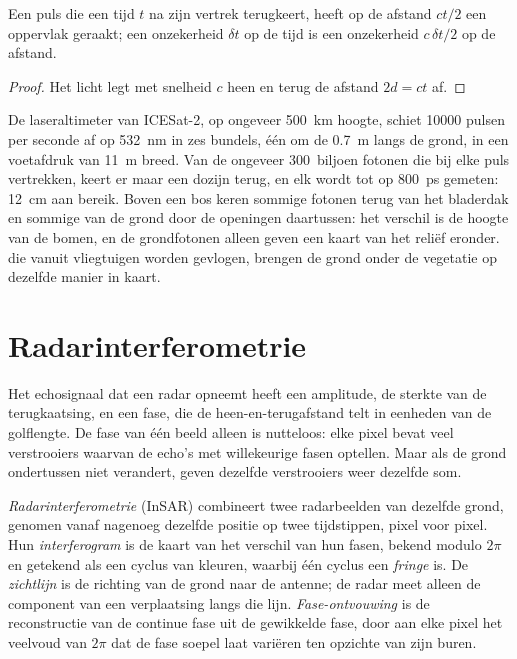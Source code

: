 \begin{proposition}[Vluchttijd]\label{prop:b3:remote-sensing-gis:tof}
Een puls die een tijd $t$ na zijn vertrek terugkeert, heeft
op de afstand $ct/2$ een oppervlak geraakt; een onzekerheid $\delta t$ op de tijd is een onzekerheid
$c\,\delta t/2$ op de afstand.
\end{proposition}

\begin{proof}
Het licht legt met snelheid $c$ heen en terug de afstand $2d = ct$ af.
\end{proof}

De laseraltimeter van ICESat-2, op ongeveer \qty{500}{km} hoogte, schiet
\num{10000} pulsen per seconde af op \qty{532}{nm} in zes bundels, één om de
\qty{0.7}{m} langs de grond, in een voetafdruk van \qty{11}{m} breed. Van de
ongeveer 300~biljoen fotonen die bij elke puls vertrekken, keert er maar een dozijn
terug, en elk wordt tot op \qty{800}{ps} gemeten: \qty{12}{cm} aan bereik. Boven een
bos keren sommige fotonen terug van het bladerdak en sommige van de grond
door de openingen daartussen: het verschil is de hoogte van de bomen, en de
grondfotonen alleen geven een kaart van het reliëf eronder.  die vanuit
vliegtuigen worden gevlogen, brengen de grond onder de vegetatie op dezelfde manier in kaart.

\section{Radarinterferometrie}\label{sec:b3:remote-sensing-gis:insar}

Het echosignaal dat een radar opneemt heeft een amplitude, de sterkte van de terugkaatsing,
en een fase, die de heen-en-terugafstand telt in eenheden van de
golflengte. De fase van één beeld alleen is nutteloos: elke pixel bevat veel
verstrooiers waarvan de echo's met willekeurige fasen optellen. Maar als de grond
ondertussen niet verandert, geven dezelfde verstrooiers weer dezelfde som.

\begin{definition}\label{def:b3:remote-sensing-gis:insar}
\emph{Radarinterferometrie} (InSAR) combineert
twee radarbeelden van dezelfde grond, genomen vanaf nagenoeg dezelfde positie
op twee tijdstippen, pixel voor pixel. Hun \emph{interferogram}
is de kaart van het verschil van hun fasen, bekend modulo $2\pi$ en
getekend als een cyclus van kleuren, waarbij één cyclus een \emph{fringe} is. De
\emph{zichtlijn} is de richting van de grond naar
de antenne; de radar meet alleen de component van een verplaatsing langs
die lijn. \emph{Fase-ontvouwing} is de reconstructie
van de continue fase uit de gewikkelde fase, door aan elke pixel het
veelvoud van $2\pi$ dat de fase soepel laat variëren ten opzichte van zijn buren.
\end{definition}


